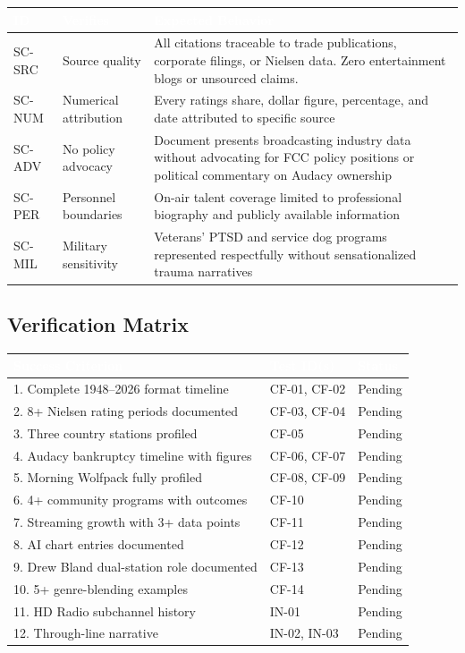 \documentclass[11pt,letterpaper]{article}
\newcommand{\tableheader}[1]{\textbf{\sffamily\textcolor{white}{#1}}}
\begin{document}
\begin{center}
\begin{tabularx}{\textwidth}{C{1.2cm}L{3cm}X}
\toprule
{}
\tableheader{ID} & \tableheader{Verifies} & \tableheader{Expected Behavior} \\
\midrule
SC-SRC & Source quality & All citations traceable to trade publications, corporate filings, or Nielsen data. Zero entertainment blogs or unsourced claims. \\
SC-NUM & Numerical attribution & Every ratings share, dollar figure, percentage, and date attributed to specific source \\
SC-ADV & No policy advocacy & Document presents broadcasting industry data without advocating for FCC policy positions or political commentary on Audacy ownership \\
SC-PER & Personnel boundaries & On-air talent coverage limited to professional biography and publicly available information \\
SC-MIL & Military sensitivity & Veterans' PTSD and service dog programs represented respectfully without sensationalized trauma narratives \\
\bottomrule
\end{tabularx}
\end{center}

\subsection{Verification Matrix}

\begin{center}
\begin{tabularx}{\textwidth}{XL{3cm}C{1.5cm}}
\toprule
{}
\tableheader{Success Criterion} & \tableheader{Test ID(s)} & \tableheader{Status} \\
. Complete 1948--2026 format timeline & CF-01, CF-02 & Pending \\
2. 8+ Nielsen rating periods documented & CF-03, CF-04 & Pending \\
3. Three country stations profiled & CF-05 & Pending \\
4. Audacy bankruptcy timeline with figures & CF-06, CF-07 & Pending \\
5. Morning Wolfpack fully profiled & CF-08, CF-09 & Pending \\
6. 4+ community programs with outcomes & CF-10 & Pending \\
7. Streaming growth with 3+ data points & CF-11 & Pending \\
8. AI chart entries documented & CF-12 & Pending \\
9. Drew Bland dual-station role documented & CF-13 & Pending \\
10. 5+ genre-blending examples & CF-14 & Pending \\
11. HD Radio subchannel history & IN-01 & Pending \\
12. Through-line narrative & IN-02, IN-03 & Pending \\
\bottomrule
\end{tabularx}
\end{center}
\end{document}
